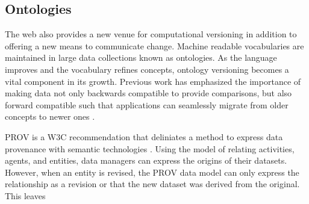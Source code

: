 \subsection{Ontologies}
The web also provides a new venue for computational versioning in addition to offering a new means to communicate change.
Machine readable vocabularies are maintained in large data collections known as ontologies.
As the language improves and the vocabulary refines concepts, ontology versioning becomes a vital component in its growth.
Previous work has emphasized the importance of making data not only backwards compatible to provide comparisons, but also forward compatible such that applications can seamlessly migrate from older concepts to newer ones \cite{Klein01ontologyversioning}.

PROV is a W3C recommendation that deliniates a method to express data provenance with semantic technologies \cite{Belhajjame2013}.
Using the model of relating activities, agents, and entities, data managers can express the origins of their datasets.
However, when an entity is revised, the PROV data model can only express the relationship as a revision or that the new dataset was derived from the original.
This leaves



